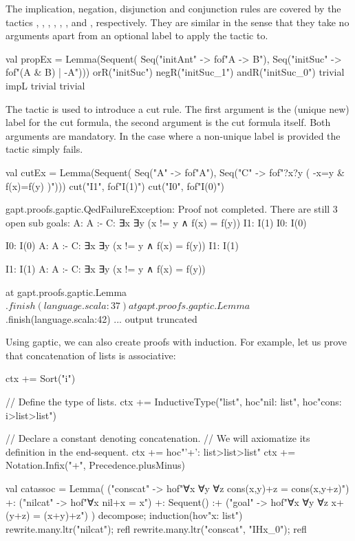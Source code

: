 \documentclass[a4paper,11pt]{book}
\newcommand{\cli}[1]{{\ttfamily {#1}}}
\begin{document}
The implication, negation, disjunction and conjunction rules are covered by the
tactics \cli{impL}, \cli{impR}, \cli{negL}, \cli{negR}, \cli{disL}, \cli{disR},
\cli{conL} and \cli{conR}, respectively. They are similar in the sense that
they take no arguments apart from an optional label to apply the tactic to.
\begin{tacticslisting}
  val propEx = Lemma(Sequent(
  Seq("initAnt" -> fof"A -> B"),
  Seq("initSuc" -> fof"(A & B) | -A"))) {
      orR("initSuc")
      negR("initSuc_1")
      andR("initSuc_0")
      trivial
      impL
      trivial
      trivial
    }
\end{tacticslisting}
\begin{tacticsoutput}

\end{tacticsoutput}

The \cli{cut} tactic is used to introduce a cut rule. The first argument is the
(unique new) label for the cut formula, the second argument is the cut formula
itself. Both arguments are mandatory. In the case where a non-unique label is
provided the tactic simply fails.
\begin{tacticslisting}
  val cutEx = Lemma(Sequent(
  Seq("A" -> fof"A"),
  Seq("C" -> fof"?x?y ( -x=y & f(x)=f(y) )"))) {
      cut("I1", fof"I(1)")
      cut("I0", fof"I(0)")
    }
\end{tacticslisting}
\begin{tacticsoutput}
gapt.proofs.gaptic.QedFailureException: Proof not completed. There are still 3 open sub goals:
A: A
:-
C: ∃x ∃y (x != y ∧ f(x) = f(y))
I1: I(1)
I0: I(0)

I0: I(0)
A: A
:-
C: ∃x ∃y (x != y ∧ f(x) = f(y))
I1: I(1)

I1: I(1)
A: A
:-
C: ∃x ∃y (x != y ∧ f(x) = f(y))

  at gapt.proofs.gaptic.Lemma$.finish(language.scala:37)
  at gapt.proofs.gaptic.Lemma$.finish(language.scala:42)
... output truncated
\end{tacticsoutput}

Using gaptic, we can also create proofs with induction.  For example, let us
prove that concatenation of lists is associative:

\begin{tacticslisting}[nosig]
  ctx += Sort("i")

  // Define the type of lists.
  ctx += InductiveType("list",
  hoc"nil: list",
  hoc"cons: i>list>list")

  // Declare a constant denoting concatenation.
  // We will axiomatize its definition in the end-sequent.
  ctx += hoc"'+': list>list>list"
  ctx += Notation.Infix("+", Precedence.plusMinus)

  val catassoc =
  Lemma(
  ("conscat" -> hof"∀x ∀y ∀z cons(x,y)+z = cons(x,y+z)") +:
  ("nilcat" -> hof"∀x nil+x = x") +:
  Sequent()
  :+ ("goal" -> hof"∀x ∀y ∀z x+(y+z) = (x+y)+z")
  ) {
      decompose; induction(hov"x: list")
      rewrite.many.ltr("nilcat"); refl
      rewrite.many.ltr("conscat", "IHx_0"); refl
    }
\end{tacticslisting}
\begin{tacticsoutput}

\end{tacticsoutput}
\end{document}
